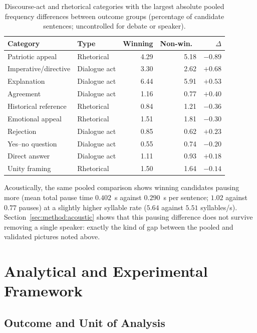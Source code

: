 \documentclass[pdflatex,sn-mathphys-num]{sn-jnl}%
\begin{document}
\begin{table}[t]
\caption{Discourse-act and rhetorical categories with the largest absolute
pooled frequency differences between outcome groups (percentage of
candidate sentences; uncontrolled for debate or speaker).}
\label{tab:tagdiff}
\centering
\footnotesize
\setlength{\tabcolsep}{3pt}
\begin{tabular}{llrrr}
\toprule
Category & Type & Winning & Non-win.\ & $\Delta$ \\
\midrule
Patriotic appeal     & Rhetorical   & 4.29 & 5.18 & $-0.89$ \\
Imperative/directive & Dialogue act & 3.30 & 2.62 & $+0.68$ \\
Explanation          & Dialogue act & 6.44 & 5.91 & $+0.53$ \\
Agreement            & Dialogue act & 1.16 & 0.77 & $+0.40$ \\
Historical reference & Rhetorical   & 0.84 & 1.21 & $-0.36$ \\
Emotional appeal     & Rhetorical   & 1.51 & 1.81 & $-0.30$ \\
Rejection            & Dialogue act & 0.85 & 0.62 & $+0.23$ \\
Yes--no question     & Dialogue act & 0.55 & 0.74 & $-0.20$ \\
Direct answer        & Dialogue act & 1.11 & 0.93 & $+0.18$ \\
Unity framing        & Rhetorical   & 1.50 & 1.64 & $-0.14$ \\
\bottomrule
\end{tabular}
\end{table}

Acoustically, the same pooled comparison shows winning candidates pausing
more (mean total pause time $0.402$~s against $0.290$~s per sentence;
$1.02$ against $0.77$ pauses) at a slightly higher syllable rate ($5.64$
against $5.51$ syllables/s). Section~\ref{sec:method:acoustic} shows that
this pausing difference does not survive removing a single speaker: exactly
the kind of gap between the pooled and validated pictures noted above.

\section{Analytical and Experimental Framework}
\label{sec:method}

\subsection{Outcome and Unit of Analysis}
\label{sec:method:unit}
\end{document}
